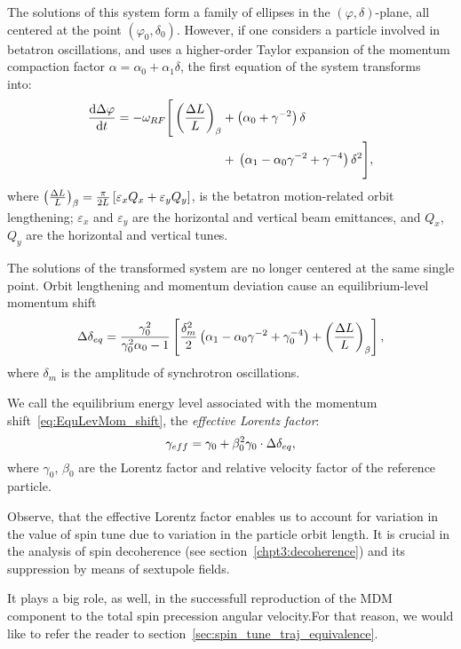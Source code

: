 The solutions of this system form a family of ellipses in the $(\varphi, \delta)$-plane, all centered at the
point $(\varphi_0,\delta_0)$. However, if one considers a particle involved in betatron oscillations, and
uses a higher-order Taylor expansion of the momentum compaction factor
$\alpha = \alpha_0 + \alpha_1\delta$, the first equation of the system
transforms into:~\cite[p.~2579]{Senichev:IPAC13}
\begin{align*}
  \ddt{\D\varphi} = -\w_{RF} \Bigg[\bkt{\frac{\Delta L}{L}}_\beta &+ \bkt{\alpha_0 + \gamma^{-2}}\delta \Bigg.\\
    &+ \Bigg.\bkt{\alpha_1 - \alpha_0\gamma^{-2} + \gamma^{-4}}\delta^2\Bigg],
\end{align*}
where $\bkt{\frac{\Delta L}{L}}_\beta = \frac{\pi}{2L}\bkt*{\varepsilon_xQ_x + \varepsilon_yQ_y}$, is
the betatron motion-related orbit lengthening; $\varepsilon_x$ and $\varepsilon_y$ are
the horizontal and vertical beam emittances, and $Q_x$, $Q_y$ are the horizontal and vertical tunes.

The solutions of the transformed system are no longer centered at the same single point. Orbit lengthening
and momentum deviation cause an equilibrium-level momentum shift~\cite[p.~2581]{Senichev:IPAC13}
\begin{equation}\label{eq:EquLevMom_shift}
\Delta\delta_{eq} = \frac{\gamma_0^2}{\gamma_0^2\alpha_0 - 1}\bkt*{\frac{\delta_m^2}{2}\bkt{\alpha_1 - \alpha_0\gamma^{-2} + \gamma_0^{-4}} + \bkt{\frac{\Delta L}{L}}_\beta},
\end{equation}
where $\delta_m$ is the amplitude of synchrotron oscillations.

We call the equilibrium energy level associated with the momentum shift~\eqref{eq:EquLevMom_shift},
the \emph{effective Lorentz factor}:
\begin{equation}\label{eq:EffectiveGamma}
\g*= \gamma_0 + \beta_0^2\gamma_0\cdot\Delta\delta_{eq},
\end{equation}
where $\gamma_0$, $\beta_0$ are the Lorentz factor and relative velocity factor of the reference particle.

Observe, that the effective Lorentz factor enables us to account for variation in the value of spin tune
due to variation in the particle orbit length. It is crucial in the analysis of
spin decoherence (see section~\ref{chpt3:decoherence}) and its suppression by means of sextupole fields.


It plays a big role, as well, in the successfull reproduction of the MDM component to the total spin precession
angular velocity.For that reason, we would like to refer the reader to section~\ref{sec:spin_tune_traj_equivalence}.
